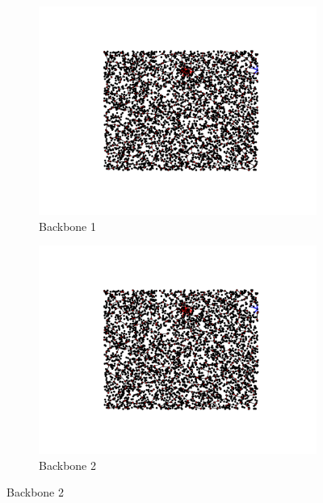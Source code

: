 \documentclass[oneside, titlepage]{scrartcl}
\begin{document}
\begin{figure}[!h]
\begin{subfigure}{0.5\textwidth}
	\centering
	\includegraphics[width=0.9\linewidth]{figures/simplegraph2.pdf}
	\caption{Backbone 1}
\end{subfigure}%
\begin{subfigure}{0.5\textwidth}
	\centering
	\includegraphics[width=0.9\linewidth]{figures/simplegraph21.pdf}
	\caption{Backbone 2}
\end{subfigure}
\end{figure}
\end{document}
